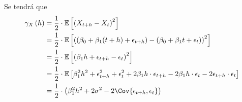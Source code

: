 \documentclass[../main.tex]{subfiles}
\begin{document}
    \begin{demostracion}
    	Se tendrá que
            \begin{align*}
            	\f {\gamma_X} h &= \frac 1 2 \cdot \Esp{\pare{X_{t+h} - X_t}^2}\\
            	&= \frac 1 2 \cdot \Esp{\pare{(\beta_0 + \beta_1 (t+h) + \epsilon_{t+h}) - (\beta_0 + \beta_1 t + \epsilon_t)}^2}\\
            	&= \frac 1 2 \cdot \Esp{\pare{\beta_1 h + \epsilon_{t+h} - \epsilon_t}^2}\\
            	&= \frac 1 2 \cdot \Esp{\beta_1^2 h^2 + \epsilon^2_{t+h} + \epsilon^2_t + 2\beta_1 h \cdot \epsilon_{t+h} - 2\beta_1 h \cdot \epsilon_t - 2\epsilon_{t+h} \cdot \epsilon_{t}}\\
            	&= \frac 1 2 \cdot \pare{\beta_1^2 h^2 + 2 \sigma^2 - 2 \Cov{\epsilon_{t+h},\epsilon_t}}
            \end{align*}

    \end{demostracion}
\end{document}
